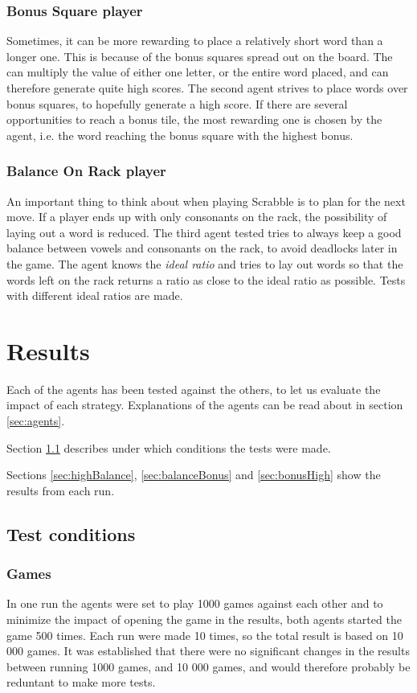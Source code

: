 \documentclass[a4paper, 12pt]{report}
\begin{document}
\subsection{Bonus Square player}
Sometimes, it can be more rewarding to place a relatively short word than a longer one. This is because of the bonus squares spread out on the board. The can multiply the value of either one letter, or the entire word placed, and can therefore generate quite high scores. The second agent strives to place words over bonus squares, to hopefully generate a high score. If there are several opportunities to reach a bonus tile, the most rewarding one is chosen by the agent, i.e. the word reaching the bonus square with the highest bonus.

\subsection{Balance On Rack player}
An important thing to think about when playing Scrabble is to plan for the next move. If a player ends up with only consonants on the rack, the possibility of laying out a word is reduced. The third agent tested tries to always keep a good balance between vowels and consonants on the rack, to avoid deadlocks later in the game. The agent knows the \emph{ideal ratio} and tries to lay out words so that the words left on the rack returns a ratio as close to the ideal ratio as possible. Tests with different ideal ratios are made.

\chapter{Results}
\label{sec:analysis}
Each of the agents has been tested against the others, to let us evaluate the impact of each strategy. Explanations of the agents can be read about in section \ref{sec:agents}. 

Section \ref{sec:conditions} describes under which conditions the tests were made.

Sections \ref{sec:highBalance}, \ref{sec:balanceBonus} and \ref{sec:bonusHigh} show the results from each run.
 
\section{Test conditions}
\label{sec:conditions}
\subsection{Games}
In one run the agents were set to play 1000 games against each other and to minimize the impact of opening the game in the results, both agents started the game 500 times. Each run were made 10 times, so the total result is based on 10 000 games. It was established that there were no significant changes in the results between running 1000 games, and 10 000 games, and would therefore probably be reduntant to make more tests. 
\end{document}
